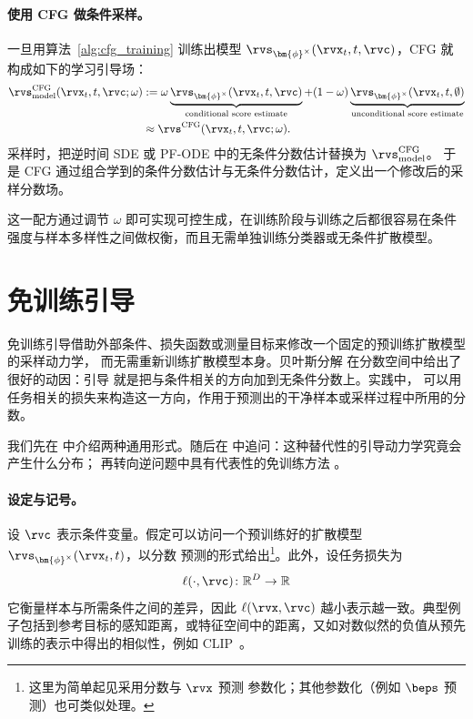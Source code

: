 \paragraph{使用 CFG 做条件采样。}
一旦用算法~\ref{alg:cfg_training} 训练出模型 $\rvs_{\bm{\phi}^\times}(\rvx_t,t,\rvc)$，CFG 就构成如下的学习引导场：
\begin{align}\label{eq:cfg-model-nn}
\rvs_{\mathrm{model}}^{\mathrm{CFG}}(\rvx_t,t,\rvc;\omega)
&:=
\omega
\underbrace{\rvs_{\bm{\phi}^\times}(\rvx_t,t,\rvc)}_{\text{conditional score estimate}}
+
(1-\omega)
\underbrace{\rvs_{\bm{\phi}^\times}(\rvx_t,t,\emptyset)}_{\text{unconditional score estimate}}
\nonumber\\
&\approx
\rvs^{\mathrm{CFG}}(\rvx_t,t,\rvc;\omega).
\end{align}
采样时，把逆时间 SDE 或
PF-ODE 中的无条件分数估计替换为
$\rvs_{\mathrm{model}}^{\mathrm{CFG}}$。
于是 CFG 通过组合学到的条件分数估计与无条件分数估计，定义出一个修改后的采样分数场。

这一配方通过调节 $\omega$ 即可实现可控生成，在训练阶段与训练之后都很容易在条件强度与样本多样性之间做权衡，而且无需单独训练分类器或无条件扩散模型。


\section{免训练引导}
免训练引导借助外部条件、损失函数或测量目标来修改一个固定的预训练扩散模型的采样动力学，
而无需重新训练扩散模型本身。贝叶斯分解
 在分数空间中给出了很好的动因：引导
就是把与条件相关的方向加到无条件分数上。实践中，
可以用任务相关的损失来构造这一方向，作用于预测出的干净样本或采样过程中所用的分数。

我们先在  中介绍两种通用形式。随后在
 中追问：这种替代性的引导动力学究竟会产生什么分布；
再转向逆问题中具有代表性的免训练方法
。

\paragraph{设定与记号。}
设 $\rvc$ 表示条件变量。假定可以访问一个预训练好的扩散模型 $\rvs_{\bm{\phi}^\times}(\rvx_t,t)$，以分数
预测的形式给出\footnote{这里为简单起见采用分数与 $\rvx$ 预测
参数化；其他参数化（例如
$\beps$ 预测）也可类似处理。}。此外，设任务损失为
\[
\ell(\cdot,\rvc)\colon\mathbb{R}^D\to\mathbb{R}
\]
它衡量样本与所需条件之间的差异，因此
$\ell(\rvx,\rvc)$ 越小表示越一致。典型例子包括到参考目标的感知距离，或特征空间中的距离，又如对数似然的负值从预先训练的表示中得出的相似性，例如
CLIP~\citep{radford2021learning}。

